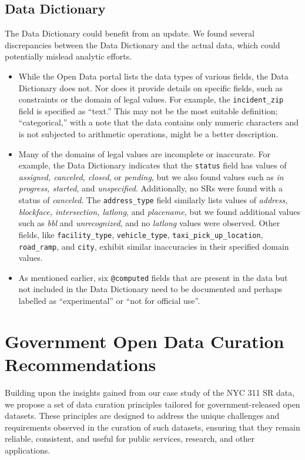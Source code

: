 \documentclass[linenumber]{jdsart}
\begin{document}
\subsection{Data Dictionary} 
\label{sec:datadictionary}

The Data Dictionary could benefit from an update. We found several 
discrepancies between the Data Dictionary and the actual data, which 
could potentially mislead analytic efforts.

\begin{itemize}
    \item While the Open Data portal lists the data types of various 
    fields, the Data Dictionary does not. Nor does it provide details 
    on specific fields, such as constraints or the domain of legal 
    values. For example, the \texttt{incident\_zip} field is specified 
    as ``text.'' This may not be the most suitable definition; 
    ``categorical,'' with a note that the data contains only numeric 
    characters and is not subjected to arithmetic operations, might 
    be a better description.
    
    \item Many of the domains of legal values are incomplete or 
    inaccurate. For example, the Data Dictionary indicates that the 
    \texttt{status} field has values of \textit{assigned, canceled, 
    closed}, or \textit{pending}, but we also found values such as 
    \textit{in progress, started}, and \textit{unspecified}. 
    Additionally, no SRs were found with a status of 
    \textit{canceled}. The \texttt{address\_type} field similarly 
    lists values of \textit{address, blockface, intersection, latlong}, 
    and \textit{placename}, but we found additional values such as 
    \textit{bbl} and \textit{unrecognized}, and no \textit{latlong} 
    values were observed. Other fields, like \texttt{facility\_type}, 
    \texttt{vehicle\_type}, \texttt{taxi\_pick\_up\_location}, 
    \texttt{road\_ramp}, and \texttt{city}, exhibit similar inaccuracies 
    in their specified domain values.
    
  \item As mentioned earlier, six \texttt{@computed} fields that are
    present in the data but not included in the Data Dictionary need
    to be documented and perhaps labelled as ``experimental'' or
    ``not for official use''.
\end{itemize}


\section{Government Open Data Curation Recommendations}
\label{sec:recommendations}
Building upon the insights gained from our case study of the 
NYC 311 SR data, we propose a set of data 
curation principles tailored for government-released open datasets. 
These principles are designed to address the unique challenges 
and requirements observed in the curation of such datasets, 
ensuring that they remain reliable, consistent, and useful for 
public services, research, and other applications.
\end{document}
